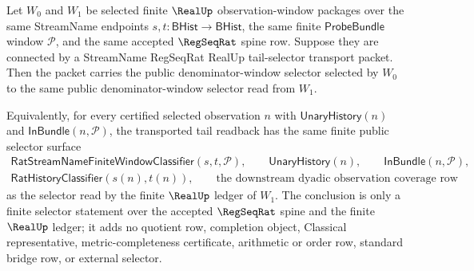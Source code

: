 \begin{theorem}
\label{thm:streamname-regseqrat-realup-tail-denominator-selector}
Let $W_0$ and $W_1$ be selected finite $\RealUp$ observation-window packages
over the same StreamName endpoints $s,t:\mathsf{BHist}\to\mathsf{BHist}$, the
same finite $\mathsf{ProbeBundle}$ window $\mathcal P$, and the same accepted
$\RegSeqRat$ spine row. Suppose they are connected by a StreamName RegSeqRat
RealUp tail-selector transport packet. Then the packet carries the public
denominator-window selector selected by $W_0$ to the same public
denominator-window selector read from $W_1$.

Equivalently, for every certified selected observation $n$ with
$\mathsf{UnaryHistory}(n)$ and $\mathsf{InBundle}(n,\mathcal P)$, the transported
tail readback has the same finite public selector surface
$$
\begin{gathered}
\mathsf{RatStreamNameFiniteWindowClassifier}(s,t,\mathcal P),\qquad
\mathsf{UnaryHistory}(n),\qquad
\mathsf{InBundle}(n,\mathcal P),\\
\mathsf{RatHistoryClassifier}(s(n),t(n)),\qquad
\text{the downstream dyadic observation coverage row}
\end{gathered}
$$
as the selector read by the finite $\RealUp$ ledger of $W_1$. The conclusion is
only a finite selector statement over the accepted $\RegSeqRat$ spine and the
finite $\RealUp$ ledger; it adds no quotient row, completion object, Classical
representative, metric-completeness certificate, arithmetic or order row,
standard bridge row, or external selector.
\end{theorem}
